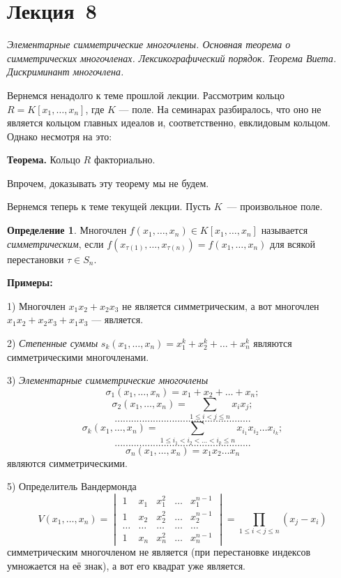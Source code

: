 \documentclass[a4paper,10pt]{amsart}
\theoremstyle{definition}
\newtheorem{definition}{Определение}
\theoremstyle{remark}
\begin{document}
\newpage

\section*{Лекция~8}

\medskip

{\it Элементарные симметрические многочлены. Основная теорема о
	симметрических многочленах. Лексикографический порядок. Теорема
	Виета. Дискриминант многочлена.}

\medskip

Вернемся ненадолго к теме прошлой лекции. Рассмотрим кольцо $R = K[x_1, \ldots, x_n]$, где 	$K$ --- поле. 
На семинарах разбиралось, что оно не является кольцом главных идеалов и, соответственно, евклидовым кольцом. Однако несмотря на это:

\textbf{Теорема.} Кольцо $R$ факториально.

Впрочем, доказывать эту теорему мы не будем.

Вернемся теперь к теме текущей лекции. Пусть $K$~--- произвольное поле.

\begin{definition}
	Многочлен $f(x_1,\ldots,x_n)\in K[x_1,\ldots,x_n]$ называется {\it
		симметрическим}, если
	$f(x_{\tau(1)},\ldots,x_{\tau(n)})=f(x_1,\ldots,x_n)$ для всякой
	перестановки $\tau \in S_n$.
\end{definition}

\textbf{Примеры:}

1) Многочлен $x_1x_2 + x_2x_3$ не является симметрическим, а вот многочлен $x_1x_2 + x_2x_3 + x_1x_3$ --- является.

2) {\it Степенные суммы} $s_k(x_1, \ldots, x_n) = x_1^k + x_2^k +
\ldots + x_n^k$ являются симметрическими многочленами.

3) {\it Элементарные симметрические многочлены}
$$
\sigma_1(x_1, \ldots, x_n) = x_1 + x_2 + \ldots + x_n;
$$
$$
\sigma_2(x_1, \ldots, x_n) = \sum \limits_{1 \leqslant i < j
	\leqslant n} x_i x_j;
$$
$$
..................................................
$$
$$
\sigma_k(x_1, \ldots, x_n) = \sum \limits_{1 \leqslant i_1 < i_2 <
	\ldots < i_k \leqslant n} x_{i_1} x_{i_2} \ldots x_{i_k};
$$
$$
..................................................
$$
$$
\sigma_n(x_1, \ldots, x_n) = x_1 x_2 \ldots x_n
$$
являются симметрическими.

5) Определитель Вандермонда
$$
V(x_1, \ldots, x_n) =
\begin{vmatrix}
1 & x_1 & x_1^2 & \ldots & x_1^{n-1} \\
1 & x_2 & x_2^2 & \ldots & x_2^{n-1} \\
\ldots & \ldots & \ldots & \ldots & \ldots \\
1 & x_n & x_n^2 & \ldots & x_n^{n-1}
\end{vmatrix} =
\prod \limits_{1 \leqslant i < j \leqslant n} (x_j - x_i)
$$
симметрическим многочленом не является (при перестановке индексов
умножается на её знак), а вот его квадрат уже является.
\end{document}
